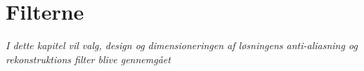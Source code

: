 \chapter{Filterne}\label{kap:filtre}
\vspace*{0.5 cm}
\emph{I dette kapitel vil valg, design og dimensioneringen af løsningens anti-aliasning og rekonstruktions filter blive gennemgået}
